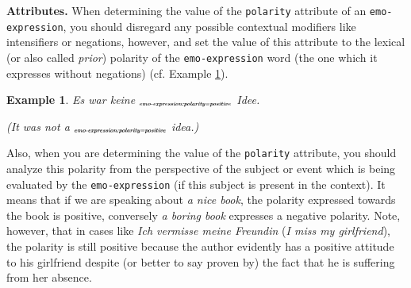 \documentclass[11pt,a4paper]{article}
\theoremstyle{mytheoremstyle}
\newtheorem{exmp}{Example}[section]
\newcommand{\mtag}[2]{{\upshape[\emph{#2}\upshape]$_{\textrm{\bfseries\emph{\tiny
        #1}}}$}}
\newcommand{\emoexpression}[2][]{\mtag{emo-\-ex\-pression\ifstrempty{#1}{}{:#1}}{#2}}
\begin{document}
\noindent\textbf{Attributes.} When determining the value of the
\texttt{polarity} attribute of an \texttt{emo-expression}, you should
disregard any possible contextual modifiers like intensifiers or
negations, however, and set the value of this attribute to the lexical
(or also called \emph{prior}) polarity of the \texttt{emo-expression}
word (the one which it expresses without negations) (cf. Example
\ref{exmp:emo-expression-polarity}).
\begin{exmp}
Es war keine \emoexpression[polarity=positive]{gute} Idee.

(It was not a \emoexpression[polarity=positive]{good} idea.)\label{exmp:emo-expression-polarity}
\end{exmp}

Also, when you are determining the value of the \texttt{polarity}
attribute, you should analyze this polarity from the perspective of
the subject or event which is being evaluated by the
\texttt{emo-expression} (if this subject is present in the context).
It means that if we are speaking about \textit{a nice book}, the
polarity expressed towards the book is positive, conversely \textit{a
  boring book} expresses a negative polarity.  Note, however, that in
cases like \textit{Ich vermisse meine Freundin} (\textit{I miss my
  girlfriend}), the polarity is still positive because the author
evidently has a positive attitude to his girlfriend despite (or better
to say proven by) the fact that he is suffering from her absence.
\end{document}
